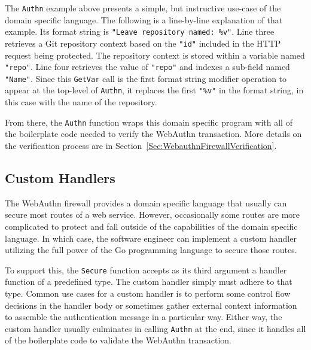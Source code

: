 
The \lstinline{Authn} example above presents a simple, but instructive use-case of the domain specific language. The following is a line-by-line explanation of that example. Its format string is \lstinline{"Leave repository named: %v"}. Line three retrieves a Git repository context based on the \lstinline{"id"} included in the HTTP request being protected. The repository context is stored within a variable named \lstinline{"repo"}. Line four retrieves the value of \lstinline{"repo"} and indexes a sub-field named \lstinline{"Name"}. Since this \lstinline{GetVar} call is the first format string modifier operation to appear at the top-level of \lstinline{Authn}, it replaces the first \lstinline{"%v"} in the format string, in this case with the name of the repository.

From there, the \lstinline{Authn} function wraps this domain specific program with all of the boilerplate code needed to verify the WebAuthn transaction. More details on the verification process are in Section~\ref{Sec:WebauthnFirewallVerification}.




\subsection{Custom Handlers}\label{Sec:CustomHandlers}



The WebAuthn firewall provides a domain specific language that usually can secure most routes of a web service. However, occasionally some routes are more complicated to protect and fall outside of the capabilities of the domain specific language. In which case, the software engineer can implement a custom handler utilizing the full power of the Go programming language to secure those routes.

To support this, the \lstinline{Secure} function accepts as its third argument a handler function of a predefined type. The custom handler simply must adhere to that type. Common use cases for a custom handler is to perform some control flow decisions in the handler body or sometimes gather external context information to assemble the authentication message in a particular way. Either way, the custom handler usually culminates in calling \lstinline{Authn} at the end, since it handles all of the boilerplate code to validate the WebAuthn transaction.

